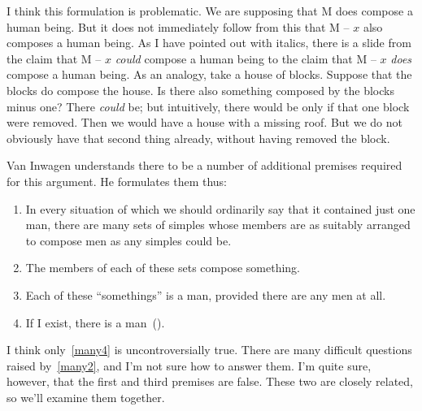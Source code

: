 \documentclass[11pt]{article}
\begin{document}
\begin{spacing}{1.5}
I think this formulation is problematic.  We are supposing that M does compose a human being.  But it does not immediately follow from this that M -- $x$ also composes a human being.  As I have pointed out with italics, there is a slide from the claim that M -- $x$ {\em could} compose a human being to the claim that M -- $x$ {\em does} compose a human being.  As an analogy, take a house of blocks.  Suppose that the blocks do compose the house.  Is there also something composed by the blocks minus one? There {\em could} be; but intuitively, there would be only if that one block were removed.  Then we would have a house with a missing roof.  But we do not obviously have that second thing already, without having removed the block.

Van Inwagen understands there to be a number of additional premises required for this argument.  He formulates them thus:
\begin{enumerate}
	\item In every situation of which we should ordinarily say that it contained just one man, there are many sets of simples whose members are as suitably arranged to compose men as any simples could be.  \label{many1}
	\item The members of each of these sets compose something.  \label{many2}
	\item Each of these ``somethings'' is a man, provided there are any men at all.  \label{many3}
	\item If I exist, there is a man~(\citeyear[216]{inwagen1995}).  \label{many4}
\end{enumerate}
I think only~\ref{many4} is uncontroversially true.  There are many difficult questions raised by~\ref{many2}, and I'm not sure how to answer them.  I'm quite sure, however, that the first and third premises are false.  These two are closely related, so we'll examine them together.


\end{spacing}
\end{document}

